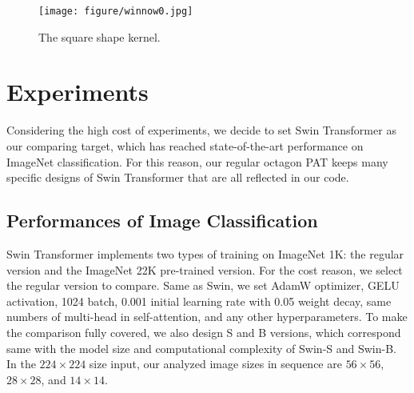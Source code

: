 \documentclass{article}
\theoremstyle{plain}
\theoremstyle{definition}
\theoremstyle{remark}
\begin{document}
\begin{figure}[h]
\centering
    \texttt{[image: figure/winnow0.jpg]}
\caption{The square shape kernel.}
\label{fig:winnow0}
\end{figure}


\section{Experiments}
Considering the high cost of experiments, we decide to set Swin Transformer as our comparing target, which has reached state-of-the-art performance on ImageNet classification. For this reason, our regular octagon PAT keeps many specific designs of Swin Transformer that are all reflected in our code.
\subsection{Performances of Image Classification}
Swin Transformer implements two types of training on ImageNet 1K: the regular version and the ImageNet 22K pre-trained version. For the cost reason, we select the regular version to compare. Same as Swin, we set AdamW optimizer, GELU activation, 1024 batch, 0.001 initial learning rate with 0.05 weight decay, same numbers of multi-head in self-attention, and any other hyperparameters. To make the comparison fully covered, we also design S and B versions, which correspond same with the model size and computational complexity of Swin-S and Swin-B. In the $224\times224$ size input, our analyzed image sizes in sequence are $56\times56$, $28\times28$, and $14\times14$.
\end{document}
